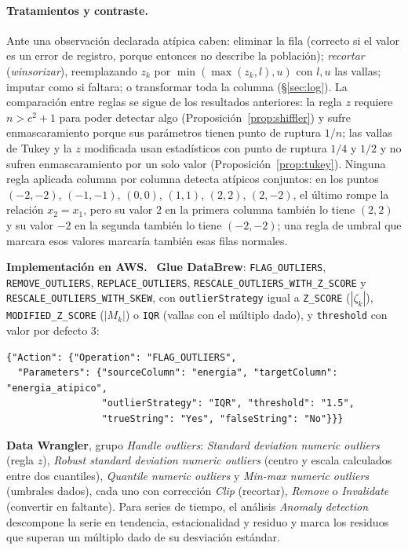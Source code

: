 \documentclass[11pt,a4paper]{article}
\theoremstyle{plain}
\theoremstyle{definition}
\theoremstyle{remark}
\newcommand{\1}{\mathbf{1}}
\newenvironment{aws}{\par\medskip\sloppy\noindent\textbf{Implementación en AWS.}\ }{\par\medskip}
\begin{document}
\paragraph{Tratamientos y contraste.} Ante una observación declarada
atípica caben: eliminar la fila (correcto si el valor es un error de
registro, porque entonces no describe la población); \emph{recortar}
(\emph{winsorizar}), reemplazando $z_k$ por $\min(\max(z_k,l),u)$ con
$l,u$ las vallas; imputar como si faltara; o transformar toda la columna
(\S\ref{sec:log}). La comparación entre reglas se sigue de los resultados
anteriores: la regla $z$ requiere $n>c^2+1$ para poder detectar algo
(Proposición~\ref{prop:shiffler}) y sufre enmascaramiento porque sus
parámetros tienen punto de ruptura $1/n$; las vallas de Tukey y la $z$
modificada usan estadísticos con punto de ruptura $1/4$ y $1/2$ y no
sufren enmascaramiento por un solo valor
(Proposición~\ref{prop:tukey}). Ninguna regla aplicada columna por
columna detecta atípicos conjuntos: en los puntos $(-2,-2)$, $(-1,-1)$,
$(0,0)$, $(1,1)$, $(2,2)$, $(2,-2)$, el último rompe la relación $x_2=x_1$,
pero su valor $2$ en la primera columna también lo tiene $(2,2)$ y su valor
$-2$ en la segunda también lo tiene $(-2,-2)$; una regla de umbral que
marcara esos valores marcaría también esas filas normales.

\begin{aws}
\textbf{Glue DataBrew}: \texttt{FLAG\_OUTLIERS},
\texttt{REMOVE\_OUTLIERS}, \texttt{REPLACE\_OUTLIERS},
\texttt{RESCALE\_OUTLIERS\_WITH\_Z\_SCORE} y
\texttt{RESCALE\_OUTLIERS\_WITH\_SKEW}, con \texttt{outlierStrategy} igual
a \texttt{Z\_SCORE} ($|\zeta_k|$), \texttt{MODIFIED\_Z\_SCORE} ($|M_k|$) o
\texttt{IQR} (vallas con el múltiplo dado), y \texttt{threshold} con valor
por defecto $3$:
\begin{lstlisting}
{"Action": {"Operation": "FLAG_OUTLIERS",
  "Parameters": {"sourceColumn": "energia", "targetColumn": "energia_atipico",
                 "outlierStrategy": "IQR", "threshold": "1.5",
                 "trueString": "Yes", "falseString": "No"}}}
\end{lstlisting}
\textbf{Data Wrangler}, grupo \emph{Handle outliers}: \emph{Standard
deviation numeric outliers} (regla $z$), \emph{Robust standard deviation
numeric outliers} (centro y escala calculados entre dos cuantiles),
\emph{Quantile numeric outliers} y \emph{Min-max numeric outliers}
(umbrales dados), cada uno con corrección \emph{Clip} (recortar),
\emph{Remove} o \emph{Invalidate} (convertir en faltante). Para series de
tiempo, el análisis \emph{Anomaly detection} descompone la serie en
tendencia, estacionalidad y residuo y marca los residuos que superan un
múltiplo dado de su desviación estándar.
\end{aws}
\end{document}
